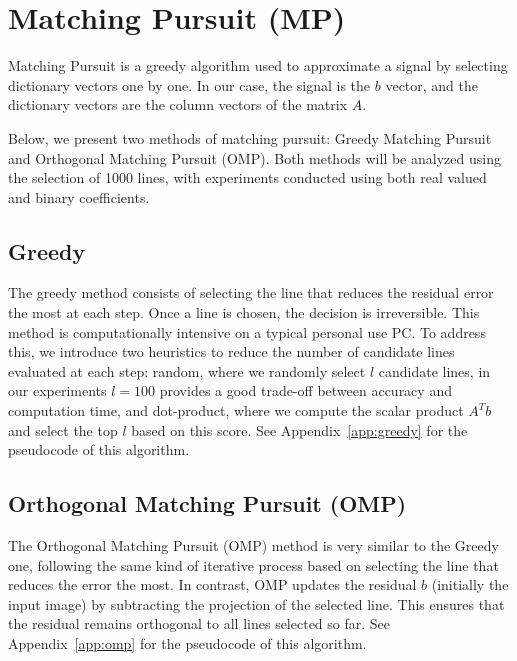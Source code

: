 \section{Matching Pursuit (MP)}

Matching Pursuit is a greedy algorithm used to approximate a signal by selecting dictionary vectors one by one. In our case, the signal is the \(b\) vector, and the dictionary vectors are the column vectors of the matrix \(A\).

Below, we present two methods of matching pursuit: Greedy Matching Pursuit and Orthogonal Matching Pursuit (OMP). Both methods will be analyzed using the selection of 1000 lines, with experiments conducted using both real valued and binary coefficients.

\subsection{Greedy}

The greedy method consists of selecting the line that reduces the residual error the most at each step. Once a line is chosen, the decision is irreversible. This method is computationally intensive on a typical personal use PC. To address this, we introduce two heuristics to reduce the number of candidate lines evaluated at each step: random, where we randomly select \(l\) candidate lines, in our experiments \(l=100\) provides a good trade-off between accuracy and computation time, and dot-product, where we compute the scalar product \(A^Tb\) and select the top \(l\) based on this score. See Appendix~\ref{app:greedy} for the pseudocode of this algorithm.

\subsection{Orthogonal Matching Pursuit (OMP)}

The Orthogonal Matching Pursuit (OMP) method is very similar to the Greedy one, following the same kind of iterative process based on selecting the line that reduces the error the most. In contrast, OMP updates the residual \(b\) (initially the input image) by subtracting the projection of the selected line. This ensures that the residual remains orthogonal to all lines selected so far. See Appendix~\ref{app:omp} for the pseudocode of this algorithm.

